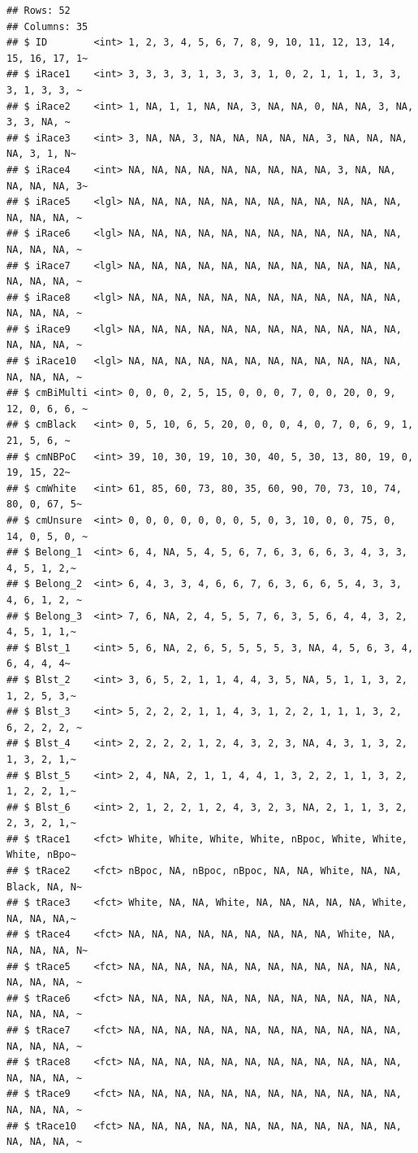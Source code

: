 \documentclass[
]{book}
\begin{document}
\begin{verbatim}
## Rows: 52
## Columns: 35
## $ ID        <int> 1, 2, 3, 4, 5, 6, 7, 8, 9, 10, 11, 12, 13, 14, 15, 16, 17, 1~
## $ iRace1    <int> 3, 3, 3, 3, 1, 3, 3, 3, 1, 0, 2, 1, 1, 1, 3, 3, 3, 1, 3, 3, ~
## $ iRace2    <int> 1, NA, 1, 1, NA, NA, 3, NA, NA, 0, NA, NA, 3, NA, 3, 3, NA, ~
## $ iRace3    <int> 3, NA, NA, 3, NA, NA, NA, NA, NA, 3, NA, NA, NA, NA, 3, 1, N~
## $ iRace4    <int> NA, NA, NA, NA, NA, NA, NA, NA, NA, 3, NA, NA, NA, NA, NA, 3~
## $ iRace5    <lgl> NA, NA, NA, NA, NA, NA, NA, NA, NA, NA, NA, NA, NA, NA, NA, ~
## $ iRace6    <lgl> NA, NA, NA, NA, NA, NA, NA, NA, NA, NA, NA, NA, NA, NA, NA, ~
## $ iRace7    <lgl> NA, NA, NA, NA, NA, NA, NA, NA, NA, NA, NA, NA, NA, NA, NA, ~
## $ iRace8    <lgl> NA, NA, NA, NA, NA, NA, NA, NA, NA, NA, NA, NA, NA, NA, NA, ~
## $ iRace9    <lgl> NA, NA, NA, NA, NA, NA, NA, NA, NA, NA, NA, NA, NA, NA, NA, ~
## $ iRace10   <lgl> NA, NA, NA, NA, NA, NA, NA, NA, NA, NA, NA, NA, NA, NA, NA, ~
## $ cmBiMulti <int> 0, 0, 0, 2, 5, 15, 0, 0, 0, 7, 0, 0, 20, 0, 9, 12, 0, 6, 6, ~
## $ cmBlack   <int> 0, 5, 10, 6, 5, 20, 0, 0, 0, 4, 0, 7, 0, 6, 9, 1, 21, 5, 6, ~
## $ cmNBPoC   <int> 39, 10, 30, 19, 10, 30, 40, 5, 30, 13, 80, 19, 0, 19, 15, 22~
## $ cmWhite   <int> 61, 85, 60, 73, 80, 35, 60, 90, 70, 73, 10, 74, 80, 0, 67, 5~
## $ cmUnsure  <int> 0, 0, 0, 0, 0, 0, 0, 5, 0, 3, 10, 0, 0, 75, 0, 14, 0, 5, 0, ~
## $ Belong_1  <int> 6, 4, NA, 5, 4, 5, 6, 7, 6, 3, 6, 6, 3, 4, 3, 3, 4, 5, 1, 2,~
## $ Belong_2  <int> 6, 4, 3, 3, 4, 6, 6, 7, 6, 3, 6, 6, 5, 4, 3, 3, 4, 6, 1, 2, ~
## $ Belong_3  <int> 7, 6, NA, 2, 4, 5, 5, 7, 6, 3, 5, 6, 4, 4, 3, 2, 4, 5, 1, 1,~
## $ Blst_1    <int> 5, 6, NA, 2, 6, 5, 5, 5, 5, 3, NA, 4, 5, 6, 3, 4, 6, 4, 4, 4~
## $ Blst_2    <int> 3, 6, 5, 2, 1, 1, 4, 4, 3, 5, NA, 5, 1, 1, 3, 2, 1, 2, 5, 3,~
## $ Blst_3    <int> 5, 2, 2, 2, 1, 1, 4, 3, 1, 2, 2, 1, 1, 1, 3, 2, 6, 2, 2, 2, ~
## $ Blst_4    <int> 2, 2, 2, 2, 1, 2, 4, 3, 2, 3, NA, 4, 3, 1, 3, 2, 1, 3, 2, 1,~
## $ Blst_5    <int> 2, 4, NA, 2, 1, 1, 4, 4, 1, 3, 2, 2, 1, 1, 3, 2, 1, 2, 2, 1,~
## $ Blst_6    <int> 2, 1, 2, 2, 1, 2, 4, 3, 2, 3, NA, 2, 1, 1, 3, 2, 2, 3, 2, 1,~
## $ tRace1    <fct> White, White, White, White, nBpoc, White, White, White, nBpo~
## $ tRace2    <fct> nBpoc, NA, nBpoc, nBpoc, NA, NA, White, NA, NA, Black, NA, N~
## $ tRace3    <fct> White, NA, NA, White, NA, NA, NA, NA, NA, White, NA, NA, NA,~
## $ tRace4    <fct> NA, NA, NA, NA, NA, NA, NA, NA, NA, White, NA, NA, NA, NA, N~
## $ tRace5    <fct> NA, NA, NA, NA, NA, NA, NA, NA, NA, NA, NA, NA, NA, NA, NA, ~
## $ tRace6    <fct> NA, NA, NA, NA, NA, NA, NA, NA, NA, NA, NA, NA, NA, NA, NA, ~
## $ tRace7    <fct> NA, NA, NA, NA, NA, NA, NA, NA, NA, NA, NA, NA, NA, NA, NA, ~
## $ tRace8    <fct> NA, NA, NA, NA, NA, NA, NA, NA, NA, NA, NA, NA, NA, NA, NA, ~
## $ tRace9    <fct> NA, NA, NA, NA, NA, NA, NA, NA, NA, NA, NA, NA, NA, NA, NA, ~
## $ tRace10   <fct> NA, NA, NA, NA, NA, NA, NA, NA, NA, NA, NA, NA, NA, NA, NA, ~
\end{verbatim}
\end{document}
